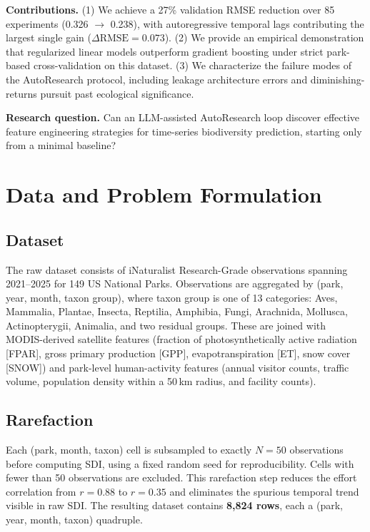 \documentclass{article}
\begin{document}
\textbf{Contributions.} (1) We achieve a 27\% validation RMSE
reduction over 85 experiments (0.326 $\to$ 0.238), with autoregressive
temporal lags contributing the largest single gain
($\Delta\text{RMSE} = 0.073$). (2) We provide an empirical
demonstration that regularized linear models outperform gradient
boosting under strict park-based cross-validation on this dataset.
(3) We characterize the failure modes of the AutoResearch protocol,
including leakage architecture errors and diminishing-returns pursuit
past ecological significance.

\textbf{Research question.} Can an LLM-assisted AutoResearch loop
discover effective feature engineering strategies for time-series
biodiversity prediction, starting only from a minimal baseline?

\section{Data and Problem Formulation}
\label{sec:data}

\subsection{Dataset}

The raw dataset consists of iNaturalist Research-Grade observations
\citep{inaturalist2025} spanning 2021--2025 for 149 US National Parks.
Observations are aggregated by (park, year, month, taxon group), where
taxon group is one of 13 categories: Aves, Mammalia, Plantae, Insecta,
Reptilia, Amphibia, Fungi, Arachnida, Mollusca, Actinopterygii,
Animalia, and two residual groups. These are joined with MODIS-derived
satellite features (fraction of photosynthetically active radiation
[FPAR], gross primary production [GPP], evapotranspiration [ET], snow
cover [SNOW]) and park-level human-activity features (annual visitor
counts, traffic volume, population density within a 50\,km radius, and
facility counts).

\subsection{Rarefaction}

Each (park, month, taxon) cell is subsampled to exactly $N = 50$
observations before computing SDI, using a fixed random seed for
reproducibility. Cells with fewer than 50 observations are excluded.
This rarefaction step \citep{hurlbert1971} reduces the effort
correlation from $r = 0.88$ to $r = 0.35$ and eliminates the
spurious temporal trend visible in raw SDI. The resulting dataset
contains \textbf{8,824 rows}, each a (park, year, month, taxon)
quadruple.
\end{document}
